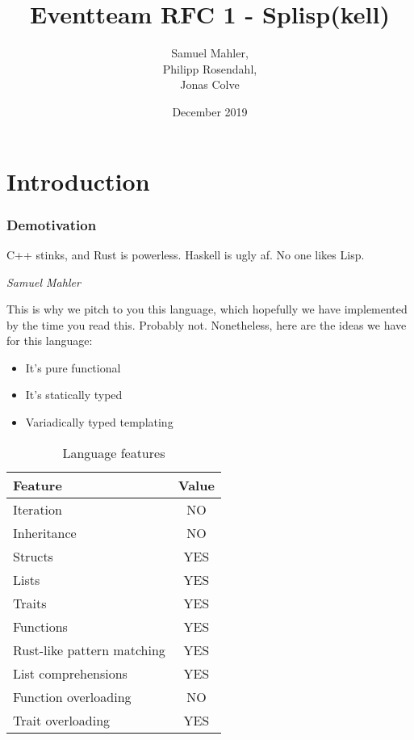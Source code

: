 \documentclass{scrartcl}
\title{Eventteam RFC 1 - Splisp(kell)}
\author{Samuel Mahler, \\
        Philipp Rosendahl, \\
        Jonas Colve}
\date{December 2019}
\begin{document}
\maketitle

\newpage

\tableofcontents

\newpage

\part{Introduction}

\section{Demotivation}

\epigraph{C++ stinks, and Rust is powerless. Haskell is ugly af. No one likes Lisp.}{\textit{Samuel Mahler}}

This is why we pitch to you this language, which hopefully we have implemented by the time you read this. Probably not. Nonetheless, here are the ideas we have for this language:

\begin{itemize}
    \item It's pure functional
    \item It's statically typed
    \item Variadically typed templating
\end{itemize}

\begin{table}[H]
    \centering
    \begin{tabular}{l|c}
        Feature                     & Value \\ \hline
        Iteration                   & NO    \\
        Inheritance                 & NO    \\
        Structs                     & YES   \\
        Lists                       & YES   \\
        Traits                      & YES   \\
        Functions                   & YES   \\
        Rust-like pattern matching  & YES   \\
        List comprehensions         & YES   \\
        Function overloading        & NO    \\
        Trait overloading           & YES\footnotemark   \\
    \end{tabular}
    \caption{Language features}
\end{table}
\end{document}
